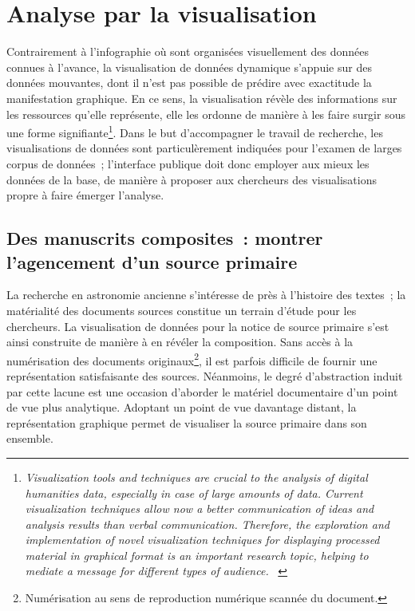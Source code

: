 \documentclass[a4paper,12pt,twoside]{book}
\newcommand{\eng}{\emph}
\newcommand{\g}[1]{\og#1~\fg}
\begin{document}
	\section{Analyse par la visualisation}
Contrairement à l'infographie où sont organisées visuellement des données connues à l'avance, la visualisation de données dynamique s'appuie sur des données mouvantes, dont il n'est pas possible de prédire avec exactitude la manifestation graphique. En ce sens, la visualisation révèle des informations sur les ressources qu'elle représente, elle les ordonne de manière à les faire surgir sous une forme signifiante\footnote{\g{\eng{Visualization tools and techniques are crucial to the analysis of digital humanities data, especially in case of large amounts of data. Current visualization techniques allow now a better communication of ideas and analysis results than verbal communication. Therefore, the exploration and implementation of novel visualization techniques for displaying processed material in graphical format is an important research topic, helping to mediate a message for different types of audience.}} \cite{ResearchDataVisualization}}. Dans le but d'accompagner le travail de recherche, les visualisations de données sont particulèrement indiquées pour l'examen de larges corpus de données~; l'interface publique doit donc employer aux mieux les données de la base, de manière à proposer aux chercheurs des visualisations propre à faire émerger l'analyse.

		\subsection{\label{Visualisation-PS}Des manuscrits composites~: montrer l'agencement d'un source primaire}
La recherche en astronomie ancienne s'intéresse de près à l'histoire des textes~; la matérialité des documents sources constitue un terrain d'étude pour les chercheurs. La visualisation de données pour la notice de source primaire s'est ainsi construite de manière à en révéler la composition. Sans accès à la numérisation des documents originaux\footnote{Numérisation au sens de reproduction numérique scannée du document.}, il est parfois difficile de fournir une représentation satisfaisante des sources. Néanmoins, le degré d'abstraction induit par cette lacune est une occasion d'aborder le matériel documentaire d'un point de vue plus analytique. Adoptant un point de vue davantage distant, la représentation graphique permet de visualiser la source primaire dans son ensemble.
\end{document}
